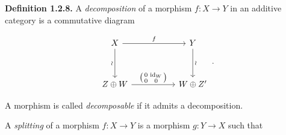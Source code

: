 \medskip
\noindent\textbf{Definition 1.2.8.}\quad
A \emph{decomposition} of a morphism $f\colon X\longrightarrow Y$ in an
additive category is a commutative diagram

\begin{equation*}
  \begin{tikzcd}[ampersand replacement=\&,column sep=5.2em,row sep=3.4em]
    X \arrow[r,"f"] \arrow[d,"\wr"']
      \& Y \arrow[d,"\wr"] \\
    Z\oplus W
      \arrow[r,"{\left(\begin{smallmatrix}0&\operatorname{id}_W\\0&0\end{smallmatrix}\right)}"]
      \& W\oplus Z'
  \end{tikzcd}\,.
\end{equation*}

A morphism is called \emph{decomposable} if it admits a decomposition.

A \emph{splitting} of a morphism $f\colon X\longrightarrow Y$ is a morphism
$g\colon Y\longrightarrow X$ such that
\endgroup
